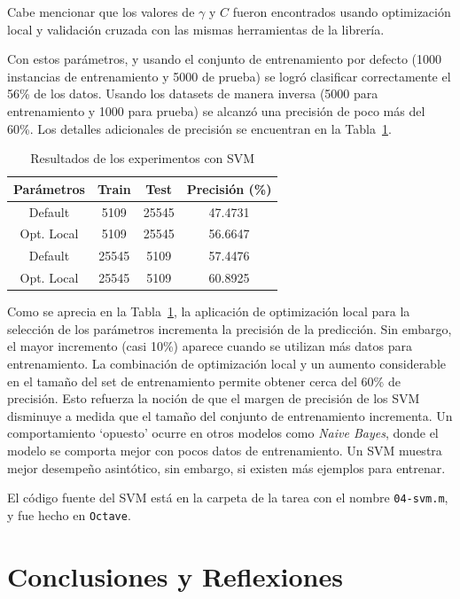 \documentclass{llncs}
\begin{document}
Cabe mencionar que los valores de $\gamma$ y $C$ fueron encontrados usando optimización local y validación cruzada con las mismas herramientas de la librería.

Con estos parámetros, y usando el conjunto de entrenamiento por defecto (1000 instancias de entrenamiento y 5000 de prueba) se logró clasificar correctamente el 56\% de los datos.
Usando los datasets de manera inversa (5000 para entrenamiento y 1000 para prueba) se alcanzó una precisión de poco más del 60\%.
Los detalles adicionales de precisión se encuentran en la Tabla~\ref{tab:svm}.

\begin{table}[htbp]
\centering
\caption{Resultados de los experimentos con SVM}
\label{tab:svm}
\begin{tabular}{@{}cccc@{}}
\toprule
Parámetros & Train & Test  & Precisión (\%) \\ \midrule
Default    & 5109  & 25545 & 47.4731   \\
Opt. Local & 5109  & 25545 & 56.6647   \\
Default    & 25545 & 5109  & 57.4476   \\
Opt. Local & 25545 & 5109  & 60.8925   \\ \bottomrule
\end{tabular}
\end{table}

Como se aprecia en la Tabla~\ref{tab:svm}, la aplicación de optimización local para la selección de los parámetros incrementa la precisión de la predicción.
Sin embargo, el mayor incremento (casi 10\%) aparece cuando se utilizan más datos para entrenamiento.
La combinación de optimización local y un aumento considerable en el tamaño del set de entrenamiento permite obtener cerca del 60\% de precisión.
Esto refuerza la noción de que el margen de precisión de los SVM disminuye a medida que el tamaño del conjunto de entrenamiento incrementa.
Un comportamiento `opuesto' ocurre en otros modelos como \textit{Naive Bayes},
donde el modelo se comporta mejor con pocos datos de entrenamiento.
Un SVM muestra mejor desempeño asintótico, sin embargo, si existen más ejemplos para entrenar.

El código fuente del SVM está en la carpeta de la tarea con el nombre \texttt{04-svm.m}, y fue hecho en \texttt{Octave}.

\section{Conclusiones y Reflexiones}
\label{sec:conc}
\end{document}
